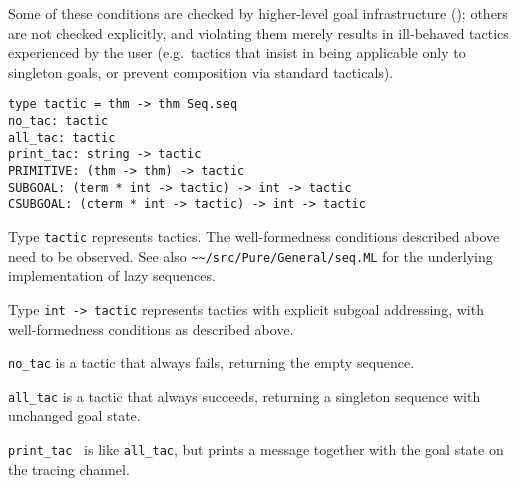 \begin{isabellebody}
\begin{isamarkuptext}
  Some of these conditions are checked by higher-level goal
  infrastructure (); others are not checked
  explicitly, and violating them merely results in ill-behaved tactics
  experienced by the user (e.g.\ tactics that insist in being
  applicable only to singleton goals, or prevent composition via
  standard tacticals).%
\end{isamarkuptext}%
\isamarkuptrue%
%
\isadelimmlref
%
\endisadelimmlref
%
\isatagmlref
%
\begin{isamarkuptext}%
\begin{mldecls}
  \verb|type tactic = thm -> thm Seq.seq| \\
  \verb|no_tac: tactic| \\
  \verb|all_tac: tactic| \\
  \verb|print_tac: string -> tactic| \\[1ex]
  \verb|PRIMITIVE: (thm -> thm) -> tactic| \\[1ex]
  \verb|SUBGOAL: (term * int -> tactic) -> int -> tactic| \\
  \verb|CSUBGOAL: (cterm * int -> tactic) -> int -> tactic| \\
  \end{mldecls}

  \begin{description}

  \item Type \verb|tactic| represents tactics.  The
  well-formedness conditions described above need to be observed.  See
  also \verb|~~/src/Pure/General/seq.ML| for the underlying
  implementation of lazy sequences.

  \item Type \verb|int -> tactic| represents tactics with
  explicit subgoal addressing, with well-formedness conditions as
  described above.

  \item \verb|no_tac| is a tactic that always fails, returning the
  empty sequence.

  \item \verb|all_tac| is a tactic that always succeeds, returning a
  singleton sequence with unchanged goal state.

  \item \verb|print_tac|~ is like \verb|all_tac|, but
  prints a message together with the goal state on the tracing
  channel.


\end{description}
\end{isamarkuptext}
\end{isabellebody}
